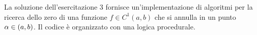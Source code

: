 La soluzione dell'esercitazione 3 fornisce un'implementazione di
algoritmi per la ricerca dello zero di una funzione $f\in
C^{1}\left(a, b\right)$ che si annulla in un punto
$\alpha\in\left( a, b\right)$. Il codice \`e organizzato con una
logica procedurale.
